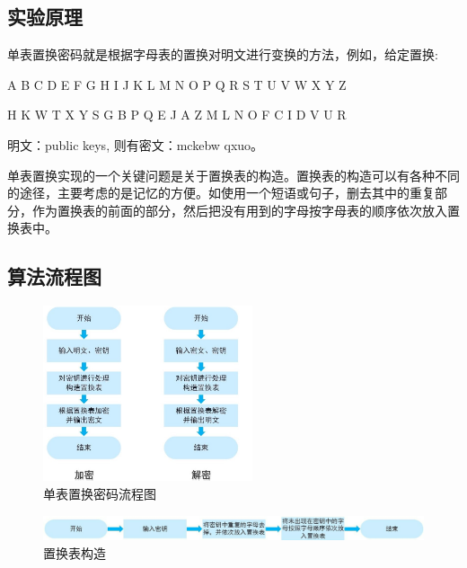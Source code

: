 \documentclass[UTF8,a4paper]{article}
\begin{document}
	\subsection{实验原理}
		单表置换密码就是根据字母表的置换对明文进行变换的方法，例如，给定置换:\par 
	\begin{center}
	A  B  C  D  E  F  G  H  I  J  K  L  M  N  O  P  Q  R  S  T  U  V  W  X  Y  Z\par 
	H  K  W  T  X  Y  S  G  B  P  Q  E  J  A  Z  M  L  N  O  F  C  I  D  V  U  R\par 
	\end{center}\par 
	明文：public keys, 则有密文：mckebw qxuo。\par 
	单表置换实现的一个关键问题是关于置换表的构造。置换表的构造可以有各种不同的途径，主要考虑的是记忆的方便。如使用一个短语或句子，删去其中的重复部分，作为置换表的前面的部分，然后把没有用到的字母按字母表的顺序依次放入置换表中。\par 

	\subsection{算法流程图}
	\newpage
	
		\begin{figure}[!ht]
	
	\centering
	\includegraphics[width=0.55\textwidth]{second.JPG}
	\caption{单表置换密码流程图}
	\label{fig:second}
\end{figure}
		\begin{figure}[!ht]
	
	\centering
	\includegraphics[width=1.1\textwidth]{getkey.JPG}
	\caption{置换表构造}
	\label{fig:getkey}
\end{figure}
\end{document}

